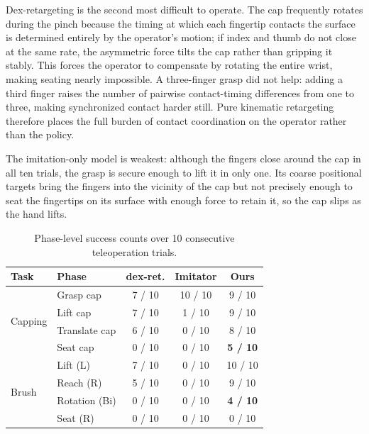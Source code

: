 \documentclass[letterpaper, 10 pt, conference]{ieeeconf}
\begin{document}
Dex-retargeting is the second most difficult to operate. The cap frequently rotates
during the pinch because the timing at which each fingertip contacts the surface is
determined entirely by the operator's motion; if index and thumb do not close at the
same rate, the asymmetric force tilts the cap rather than gripping it stably. This
forces the operator to compensate by rotating the entire wrist, making seating nearly
impossible. A three-finger grasp did not help: adding a third finger raises the number
of pairwise contact-timing differences from one to three, making synchronized contact
harder still. Pure kinematic retargeting therefore places the full burden of contact
coordination on the operator rather than the policy.

The imitation-only model is weakest: although the fingers close around the cap in all
ten trials, the grasp is secure enough to lift it in only one. Its coarse positional
targets bring the fingers into the vicinity of the cap but not precisely enough to seat
the fingertips on its surface with enough force to retain it, so the cap slips as the
hand lifts.

\begin{table}[tb]
    \centering
    \caption{Phase-level success counts over 10 consecutive teleoperation trials.}
    \label{tab:teleop}
    \begin{tabular}{llccc}
        \toprule
        \textbf{Task} & \textbf{Phase} & \textbf{dex-ret.} & \textbf{Imitator} & \textbf{Ours} \\
        \midrule
        \multirow{4}{*}{Capping}
            & Grasp cap          &  7 / 10 & 10 / 10 &  9 / 10 \\
            & Lift cap           &  7 / 10 &  1 / 10 &  9 / 10 \\
            & Translate cap      &  6 / 10 &  0 / 10 &  8 / 10 \\
            & Seat cap           &  0 / 10 &  0 / 10 &  \textbf{5 / 10} \\
        \midrule
        \multirow{4}{*}{Brush}
            & Lift (L)           &  7 / 10 &  0 / 10 & 10 / 10 \\
            & Reach (R)          &  5 / 10 &  0 / 10 &  9 / 10 \\
            & Rotation (Bi)      &  0 / 10 &  0 / 10 &  \textbf{4 / 10} \\
            & Seat (R)           &  0 / 10 &  0 / 10 &  0 / 10 \\
        \bottomrule
    \end{tabular}
\end{table}
\end{document}
